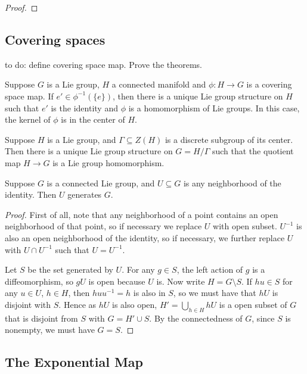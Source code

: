\documentclass[a4paper]{article}
\begin{document}
\begin{proof}
    
\end{proof}

\subsection{Covering spaces}

to do: define covering space map. Prove the theorems. 

\begin{thm}
    Suppose $G$ is a Lie group, $H$ a connected manifold and $\phi: H \to G$ is a covering space map. If $e' \in \phi^{-1}(\{e\})$, then there is a unique Lie group structure on $H$ such that $e'$ is the identity and $\phi$ is a homomorphism of Lie groups. In this case, the kernel of $\phi$ is in the center of $H$.
\end{thm}

\begin{thm}
    Suppose $H$ is a Lie group, and $\Gamma \subseteq Z(H)$ is a  discrete subgroup of its center. Then there is a unique Lie group structure on $G = H / \Gamma$ such that the quotient map $H \to G$ is a Lie group homomorphism. 
\end{thm}

\begin{thm}
    Suppose $G$ is a connected Lie group, and $U \subseteq G$ is any neighborhood of the identity. Then $U$ generates $G$.
\end{thm}

\begin{proof}
First of all, note that any neighborhood of a point contains an open neighborhood of that point, so if necessary we replace $U$ with open subset. $U^{-1}$ is also an open neighborhood of the identity, so if necessary, we further replace $U$ with $U \cap U^{-1}$ such that $U=U^{-1}$.

Let $S$ be the set generated by $U$. For any $g \in S$, the left action of $g$ is a diffeomorphism, so $gU$ is open because $U$ is. Now write $H = G \setminus S$. If $hu \in S$ for any $u \in U$, $h \in H$, then $huu^{-1} = h$ is also in $S$, so we must have that $hU$ is disjoint with $S$. Hence as $hU$ is also open, $H' = \bigcup_{h \in H} hU$ is a open subset of $G$ that is disjoint from $S$ with $G = H' \cup S$. By the connectedness of $G$, since $S$ is nonempty, we must have $G=S$. 
\end{proof}

\subsection{The Exponential Map}
\end{document}

